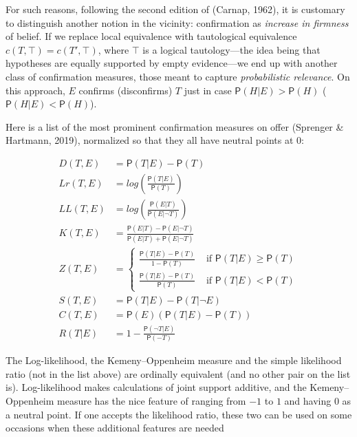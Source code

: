 \documentclass[
  10pt,
  dvipsnames,enabledeprecatedfontcommands]{scrartcl}
\newcommand{\n}{\neg}
\newcommand{\pr}[1]{\mathsf{P}(#1)}
\begin{document}
For such reasons, following the second edition of (Carnap, 1962), it is
customary to distinguish another notion in the vicinity: confirmation as
\textit{increase in firmness} of belief. If we replace local equivalence
with tautological equivalence \(c(T, \top) = c(T', \top)\), where
\(\top\) is a logical tautology---the idea being that hypotheses are
equally supported by empty evidence---we end up with another class of
confirmation measures, those meant to capture
\emph{probabilistic relevance}. On this approach, \(E\) confirms
(disconfirms) \(T\) just in case \(\pr{H \vert E} > \pr{H}\)
(\(\pr{H \vert E} < \pr{H}\)).

Here is a list of the most prominent confirmation measures on offer
(Sprenger \& Hartmann, 2019), normalized so that they all have neutral
points at 0:

\begin{align}
\tag{Difference}  D(T,E) & = \pr{T\vert E} - \pr{T}\\
\tag{Log-ratio}  Lr(T,E) &  = log\left(\frac{\pr{T\vert E}}{\pr{T}} \right) \\
\tag{Log-likelihood}   LL(T,E) & = log\left(\frac{\pr{E \vert T}}{\pr{E \vert \n T}} \right)\\
\tag{Kemeny-Oppenheim}  K(T,E) & = \frac{\pr{E\vert T} - \pr{E \vert \n T}}{\pr{E \vert T} + \pr{E \vert \n T}} \\
\tag{Generalized entailment}  Z(T,E) & = \begin{cases}
\frac{\pr{T\vert E} - \pr{T}}{1-\pr{T}} & \mbox{ if } \pr{T \vert E} \geq \pr{T}\\
\frac{\pr{T\vert E} - \pr{T}}{\pr{T}} & \mbox{ if } \pr{T \vert E} < \pr{T}
\end{cases} \\
\tag{Christensen-Joyce} S(T,E) & = \pr{T \vert E} - \pr{T \vert \n E} \\
\tag{Carnap}  C(T,E) & = \pr{E}(\pr{T\vert E} - \pr{T})\\
\tag{Rips} R(T\vert E) & = 1 - \frac{\pr{\n T\vert E}}{\pr{-T}}
\end{align}

\noindent The Log-likelihood, the Kemeny--Oppenheim measure and the
simple likelihood ratio (not in the list above) are ordinally equivalent
(and no other pair on the list is). Log-likelihood makes calculations of
joint support additive, and the Kemeny--Oppenheim measure has the nice
feature of ranging from \(-1\) to \(1\) and having 0 as a neutral point.
If one accepts the likelihood ratio, these two can be used on some
occasions when these additional features are needed
\end{document}
